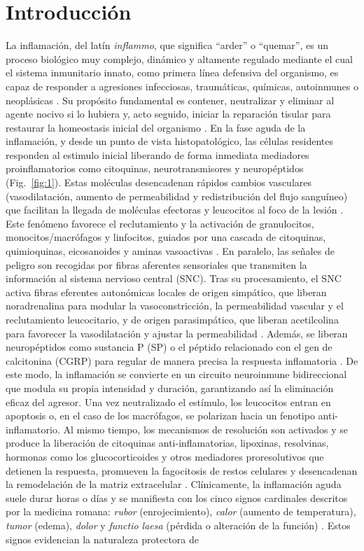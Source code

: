 \documentclass[10pt,a4paper]{article}
\begin{document}
\section{Introducción}
La inflamación, del latín \textit{inflammo}, que significa “arder” o “quemar”, es un proceso biológico muy complejo, dinámico y altamente regulado mediante el cual el sistema inmunitario innato, como primera línea defensiva del organismo, es capaz de responder a agresiones infecciosas, traumáticas, químicas, autoinmunes o neoplásicas \parencite{Du2015}. Su propósito fundamental es contener, neutralizar y eliminar al agente nocivo si lo hubiera y, acto seguido, iniciar la reparación tisular para restaurar la homeostasis inicial del organismo \parencite{Chen2010}. En la fase aguda de la inflamación, y desde un punto de vista histopatológico, las células residentes responden al estimulo inicial liberando de forma inmediata mediadores proinflamatorios como citoquinas, neurotransmisores y neuropéptidos \parencite{Bordes1994} (Fig.~\ref{fig:1}). Estas moléculas desencadenan rápidos cambios vasculares (vasodilatación, aumento de permeabilidad y redistribución del flujo sanguíneo) que facilitan la llegada de moléculas efectoras y leucocitos al foco de la lesión \parencite{Larsen1983}. Este fenómeno favorece el reclutamiento y la activación de granulocitos, monocitos/macrófagos y linfocitos, guiados por una cascada de citoquinas, quimioquinas, eicosanoides y aminas vasoactivas \parencite{Kolaczkowska2013}. En paralelo, las señales de peligro son recogidas por fibras aferentes sensoriales que transmiten la información al sistema nervioso central (SNC). Tras su procesamiento, el SNC activa fibras eferentes autonómicas locales de origen simpático, que liberan noradrenalina para modular la vasoconstricción, la permeabilidad vascular y el reclutamiento leucocitario, y de origen parasimpático, que liberan acetilcolina para favorecer la vasodilatación y ajustar la permeabilidad \parencite{Kelly2022}. Además, se liberan neuropéptidos como sustancia P (SP) o el péptido relacionado con el gen de calcitonina (CGRP) para regular de manera precisa la respuesta inflamatoria \parencite{Cuesta2002}. De este modo, la inflamación se convierte en un circuito neuroinmune bidireccional que modula su propia intensidad y duración, garantizando así la eliminación eficaz del agresor. Una vez neutralizado el estímulo, los leucocitos entran en apoptosis o, en el caso de los macrófagos, se polarizan hacia un fenotipo anti-inflamatorio. Al mismo tiempo, los mecanismos de resolución son activados y se produce la liberación de citoquinas anti-inflamatorias, lipoxinas, resolvinas, hormonas como los glucocorticoides y otros mediadores proresolutivos que detienen la respuesta, promueven la fagocitosis de restos celulares y desencadenan la remodelación de la matriz extracelular \parencite{Maderna2009}. Clínicamente, la inflamación aguda suele durar horas o días y se manifiesta con los cinco signos cardinales descritos por la medicina romana: \textit{rubor} (enrojecimiento), \textit{calor} (aumento de temperatura), \textit{tumor} (edema), \textit{dolor} y \textit{functio laesa} (pérdida o alteración de la función) \parencite{Lawrence2002}. Estos signos evidencian la naturaleza protectora de 
\end{document}
